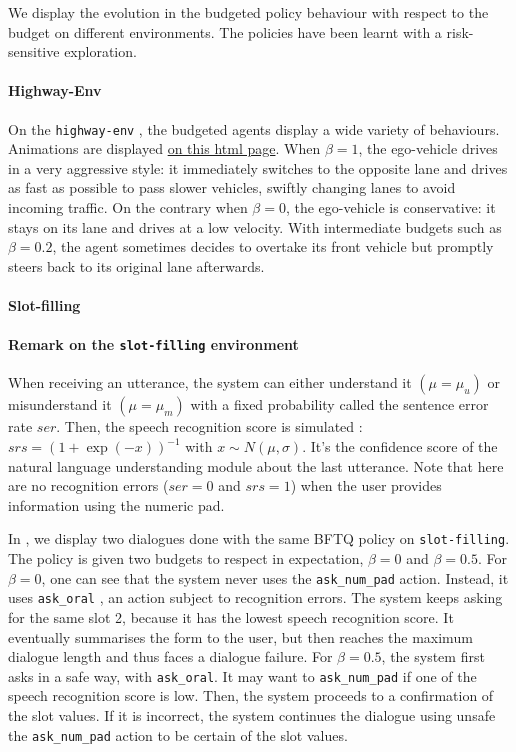 We display the evolution in the budgeted policy behaviour with respect to the budget on different environments. The policies have been learnt with a risk-sensitive exploration.

\paragraph{Highway-Env}

On the \texttt{highway-env} , the budgeted agents display a wide variety of behaviours. Animations are displayed \href{https://github.com/budgeted-rl/budgeted-rl.github.io#driving-styles}{on this html page}. When $\beta = 1$, the ego-vehicle drives in a very aggressive style: it immediately switches to the opposite lane and drives as fast as possible to pass slower vehicles, swiftly changing lanes to avoid incoming traffic. On the contrary when $\beta = 0$, the ego-vehicle is conservative: it stays on its lane and drives at a low velocity. With intermediate budgets such as $\beta = 0.2$, the agent sometimes decides to overtake its front vehicle but promptly steers back to its original lane afterwards.

\paragraph{Slot-filling}

\paragraph{Remark on the \texttt{slot-filling} environment} When receiving an utterance, the system can either understand it $(\mu=\mu_u)$ or misunderstand it $(\mu=\mu_m)$ with a fixed probability called the sentence error rate $ser$. Then, the speech recognition score is simulated \citep{Khouzaimi2015}: $srs = (1+\exp(-x))^{-1}$ with $x\sim N(\mu, \sigma)$. It's the confidence score of the natural language understanding module about the last utterance. Note that here are no recognition errors ($ser=0$ and $srs=1$) when the user provides information using the numeric pad.

In , we display two dialogues done with the same BFTQ policy on \texttt{slot-filling}. The policy is given two budgets to respect in expectation, $\beta=0$ and $\beta=0.5$. For $\beta=0$, one can see that the system never uses the \texttt{ask\_num\_pad} action. Instead, it uses \texttt{ask\_oral} , an action subject to recognition errors. The system keeps asking for the same slot 2, because it has the lowest speech recognition score. It eventually summarises the form to the user, but then reaches the maximum dialogue length and thus faces a dialogue failure. For $\beta=0.5$, the system first asks in a safe way, with \texttt{ask\_oral}. It may want to \texttt{ask\_num\_pad} if one of the speech recognition score is low. Then, the system proceeds to a confirmation of the slot values. If it is incorrect, the system continues the dialogue using unsafe the \texttt{ask\_num\_pad} action to be certain of the slot values.

